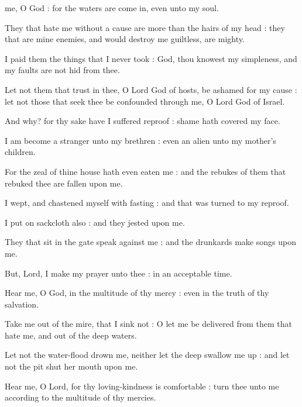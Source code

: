 

 me, O God : for the waters are come in, even unto my soul.\par
{}
They that hate me without a cause are more than the hairs of my head : they that are mine enemies, and would destroy me guiltless, are mighty.\par
{}I paid them the things that I never took : God, thou knowest my simpleness, and my faults are not hid from thee.\par
{}Let not them that trust in thee, O Lord God of hosts, be ashamed for my cause : let not those that seek thee be confounded through me, O Lord God of Israel.\par
{}And why? for thy sake have I suffered reproof : shame hath covered my face.\par
{}I am become a stranger unto my brethren : even an alien unto my mother's children.\par
{}For the zeal of thine house hath even eaten me : and the rebukes of them that rebuked thee are fallen upon me.\par
{}I wept, and chastened myself with fasting : and that was turned to my reproof.\par
{}I put on sackcloth also : and they jested upon me.\par
{}They that sit in the gate speak against me : and the drunkards make songs upon me.\par
{}But, Lord, I make my prayer unto thee : in an acceptable time.\par
{}Hear me, O God, in the multitude of thy mercy : even in the truth of thy salvation.\par
{}Take me out of the mire, that I sink not : O let me be delivered from them that hate me, and out of the deep waters.\par
{}Let not the water-flood drown me, neither let the deep swallow me up : and let not the pit shut her mouth upon me.\par
{}Hear me, O Lord, for thy loving-kindness is comfortable : turn thee unto me according to the multitude of thy mercies.\par
